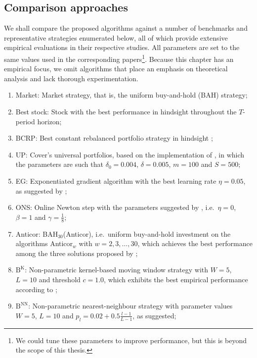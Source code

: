 \subsection{Comparison approaches}
\label{sec:comparison-approaches}

We shall compare the proposed algorithms against a number of benchmarks and representative strategies enumerated below, all of which provide extensive empirical evaluations in their respective studies. All parameters are set to the same values used in the corresponding papers\footnote{We could tune these parameters to improve performance, but this is beyond the scope of this thesis.}. Because this chapter has an empirical focus, we omit algorithms that place an emphasis on theoretical analysis and lack thorough experimentation.
\begin{enumerate}
  \item Market: Market strategy, that is, the uniform buy-and-hold (BAH) strategy;
  \item Best stock: Stock with the best performance in hindsight throughout the $T$-period horizon;
  \item BCRP: Best constant rebalanced portfolio strategy in hindsight \citep{cover};
  \item UP: Cover's universal portfolios, based on the implementation of \citet{kalai02}, in which the parameters are such that $\delta_0 = 0.004$, $\delta = 0.005$, $m = 100$ and $S = 500$;
  \item EG: Exponentiated gradient algorithm with the best learning rate $\eta = 0.05$, as suggested by \citet{eg};
  \item ONS: Online Newton step with the parameters suggested by \cite{ons}, i.e.\ $\eta = 0$, $\beta = 1$ and $\gamma = \frac{1}{8}$;
  \item Anticor: BAH$_{30}$(Anticor), i.e.\ uniform buy-and-hold investment on the algorithms Anticor$_w$ with $w = 2, 3, \ldots, 30$, which achieves the best performance among the three solutions proposed by \citet{borodin04};
  \item $\text{B}^\text{K}$: Non-parametric kernel-based moving window strategy with $W = 5$, $L = 10$ and threshold $c = 1.0$, which exhibits the best empirical performance according to \citet{bnn};
   \item $\text{B}^\text{NN}$: Non-parametric nearest-neighbour strategy with parameter values $W = 5$, $L = 10$ and $p_l = 0.02 + 0.5\frac{l-1}{L-1}$, as \citet{bnn2} suggested;

\end{enumerate}
